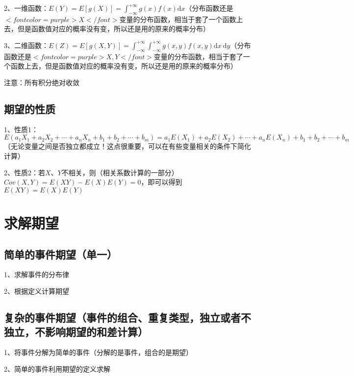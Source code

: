 2、一维函数：$ E(Y)=E[g(X)]=\int_{-\infty}^{+\infty} g(x) f(x) \mathrm{d} x $（分布函数还是$ <font color=purple>X</font> $变量的分布函数，相当于套了一个函数上去，但是函数值对应的概率没有变，所以还是用的原来的概率分布）

3、二维函数：$ E(Z)=E[g(X, Y)]=\int_{-\infty}^{+\infty} \int_{-\infty}^{+\infty} g(x, y) f(x, y) \mathrm{d} x \mathrm{~d} y $（分布函数还是$ <font color=purple>X,Y</font> $变量的分布函数，相当于套了一个函数上去，但是函数值对应的概率没有变，所以还是用的原来的概率分布）

注意：所有积分绝对收敛



\subsection{期望的性质}

1、性质1：$ E(a_1X_1+a_2X_2+\cdots+a_nX_n+b_1+b_2+\cdots+b_m)=a_1E(X_1)+a_2E(X_2)+\cdots+a_nE(X_n)+b_1+b_2+\cdots+b_m $（无论变量之间是否独立都成立！这点很重要，可以在有些变量相关的条件下简化计算）

2、性质2：若$ X $、$ Y $不相关，则（相关系数计算的一部分）$ C o v ( X , Y ) = E ( X Y ) - E ( X ) E ( Y ) =0 $，即可以得到$ E ( X Y ) = E ( X ) E ( Y ) $

\section{求解期望}



\subsection{简单的事件期望（单一）}

1、求解事件的分布律

2、根据定义计算期望



\subsection{复杂的事件期望（事件的组合、重复类型，独立或者不独立，不影响期望的和差计算）}

1、将事件分解为简单的事件（分解的是事件，组合的是期望）

2、简单的事件利用期望的定义求解

